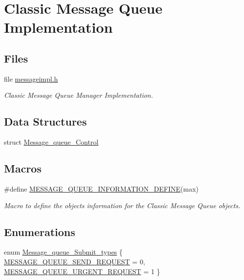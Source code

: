 \hypertarget{group__ClassicMessageQueueImpl}{}\section{Classic Message Queue Implementation}
\label{group__ClassicMessageQueueImpl}
\subsection*{Files}
\begin{DoxyCompactItemize}
\item 
file \mbox{\hyperlink{messageimpl_8h}{messageimpl.\+h}}
\begin{DoxyCompactList}\small\item\em Classic Message Queue Manager Implementation. \end{DoxyCompactList}\end{DoxyCompactItemize}
\subsection*{Data Structures}
\begin{DoxyCompactItemize}
\item 
struct \mbox{\hyperlink{structMessage__queue__Control}{Message\+\_\+queue\+\_\+\+Control}}
\end{DoxyCompactItemize}
\subsection*{Macros}
\begin{DoxyCompactItemize}
\item 
\#define \mbox{\hyperlink{group__ClassicMessageQueueImpl_gaf22b09b3480cc964301b78ac310afde9}{M\+E\+S\+S\+A\+G\+E\+\_\+\+Q\+U\+E\+U\+E\+\_\+\+I\+N\+F\+O\+R\+M\+A\+T\+I\+O\+N\+\_\+\+D\+E\+F\+I\+NE}}(max)
\begin{DoxyCompactList}\small\item\em Macro to define the objects information for the Classic Message Queue objects. \end{DoxyCompactList}\end{DoxyCompactItemize}
\subsection*{Enumerations}
\begin{DoxyCompactItemize}
\item 
enum \mbox{\hyperlink{group__ClassicMessageQueueImpl_ga488f0920d255344bbb3b76a23ad3ecc7}{Message\+\_\+queue\+\_\+\+Submit\+\_\+types}} \{ \mbox{\hyperlink{group__ClassicMessageQueueImpl_gga488f0920d255344bbb3b76a23ad3ecc7aaba5bc41f52ad7a0a6133427fa3f0ec3}{M\+E\+S\+S\+A\+G\+E\+\_\+\+Q\+U\+E\+U\+E\+\_\+\+S\+E\+N\+D\+\_\+\+R\+E\+Q\+U\+E\+ST}} = 0, 
\mbox{\hyperlink{group__ClassicMessageQueueImpl_gga488f0920d255344bbb3b76a23ad3ecc7a9f248446d19806fce900065185ac5e8b}{M\+E\+S\+S\+A\+G\+E\+\_\+\+Q\+U\+E\+U\+E\+\_\+\+U\+R\+G\+E\+N\+T\+\_\+\+R\+E\+Q\+U\+E\+ST}} = 1
 \}
\end{DoxyCompactItemize}
